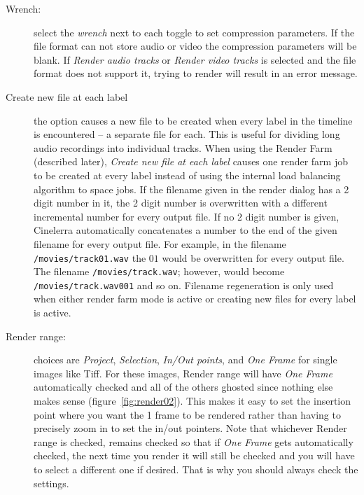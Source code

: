 \begin{description}
    \item[Wrench:] select the \textit{wrench} next to each toggle to set compression parameters.  If the file format can not store audio or video the compression parameters will be blank.  If \textit{Render audio tracks} or \textit{Render video tracks} is selected and the file format does not support it, trying to render will result in an error message.
    \item[Create new file at each label] the option causes a new file to be created when every label in the timeline is encountered – a separate file for each.  This is useful for dividing long audio recordings into individual tracks.  When using the Render Farm (described later), \textit{Create new file at each label} causes one render farm job to be created at every label instead of using the internal load balancing algorithm to space jobs.   If the filename given in the render dialog has a 2 digit number in it, the 2 digit number is overwritten with a different incremental number for every output file. If no 2 digit number is given, Cinelerra automatically concatenates a number to the end of the given filename for every output file.
    For example, in the filename \texttt{/movies/track01.wav} the $01$ would be overwritten for every output file. The filename \texttt{/movies/track.wav}; however, would become \texttt{/movies/track.wav001} and so on.  Filename regeneration is only used when either render farm mode is active or creating new files for every label is active.
    \item[Render range:] choices are \textit{Project}, \textit{Selection}, \textit{In/Out points}, and \textit{One Frame} for single images like Tiff.  For these images, Render range will have \textit{One Frame} automatically checked and all of the others ghosted since nothing else makes sense (figure~\ref{fig:render02}).  This makes it easy to set the insertion point where you want the 1 frame to be rendered rather than having to precisely zoom in to set the in/out pointers.  Note that whichever Render range is checked, remains checked so that if \textit{One Frame} gets automatically checked, the next time you render it will still be checked and you will have to select a different one if desired.  That is why you should always check the settings.
\end{description}

